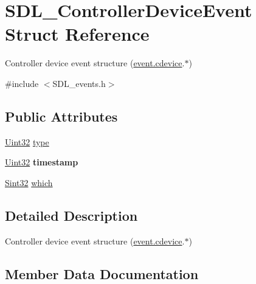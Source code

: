 \hypertarget{structSDL__ControllerDeviceEvent}{}\section{S\+D\+L\+\_\+\+Controller\+Device\+Event Struct Reference}
\label{structSDL__ControllerDeviceEvent}


Controller device event structure (\hyperlink{unionSDL__Event_ad3beed01e690b885728e0b0e1d636378}{event.\+cdevice}.$\ast$)  




{\ttfamily \#include $<$S\+D\+L\+\_\+events.\+h$>$}

\subsection*{Public Attributes}
\begin{DoxyCompactItemize}
\item 
\hyperlink{SDL__stdinc_8h_add440eff171ea5f55cb00c4a9ab8672d}{Uint32} \hyperlink{structSDL__ControllerDeviceEvent_a45b3807eaf70a5f5cf712455da277536}{type}
\item 
\hypertarget{structSDL__ControllerDeviceEvent_a62945795fc17f5000fddc80e2cf921b8}{}\hyperlink{SDL__stdinc_8h_add440eff171ea5f55cb00c4a9ab8672d}{Uint32} {\bfseries timestamp}\label{structSDL__ControllerDeviceEvent_a62945795fc17f5000fddc80e2cf921b8}

\item 
\hyperlink{SDL__stdinc_8h_a7a90b941db9d4582e9ad7abb9940ff7e}{Sint32} \hyperlink{structSDL__ControllerDeviceEvent_accb80de1619c1e790cffb6c888c915db}{which}
\end{DoxyCompactItemize}


\subsection{Detailed Description}
Controller device event structure (\hyperlink{unionSDL__Event_ad3beed01e690b885728e0b0e1d636378}{event.\+cdevice}.$\ast$) 

\subsection{Member Data Documentation}
\hypertarget{structSDL__ControllerDeviceEvent_a45b3807eaf70a5f5cf712455da277536}{}
